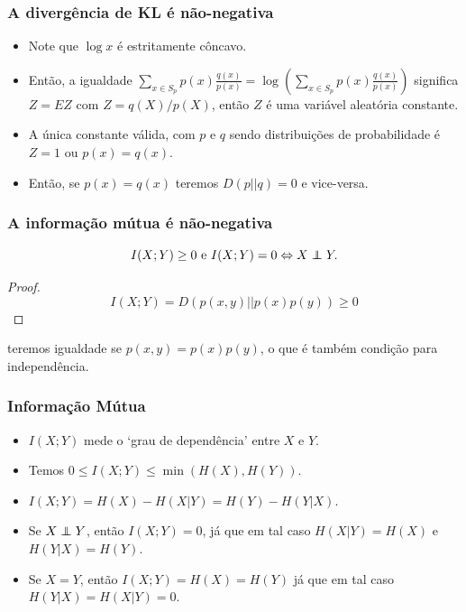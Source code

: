 \begin{frame}%
  \frametitle{A divergência de KL é não-negativa}
  \begin{itemize}
  \item Note que $\log x$ é estritamente côncavo.
  \item Então, a igualdade $\sum_{x \in S_p} p(x) \frac{q(x)}{p(x)} = \log \left( \sum_{x \in S_p} p(x) \frac{q(x)}{p(x)} \right)$ significa $Z=E Z$ com $Z = q(X)/p(X)$, então $Z$ é uma variável aleatória constante.
  \item A única constante válida, com $p$ e $q$ sendo distribuições de probabilidade é
  $Z=1$ ou $p(x)=q(x)$.
  \item Então, se $p(x)=q(x)$ teremos $D(p||q)=0$ e vice-versa.
  \end{itemize}
\end{frame}

\begin{frame}%
  \frametitle{A informação mútua é não-negativa}
  \begin{proposition}
  \begin{equation} 
  I(X;Y) \geq 0 \text{ e } I(X;Y) = 0 \Leftrightarrow X \independent Y.
  \end{equation}
  \end{proposition}

  \begin{proof}
  \begin{equation}
  I(X;Y) = D(p(x,y)||p(x)p(y)) \geq 0
  \end{equation}
  \end{proof}
  teremos igualdade se $p(x,y)=p(x)p(y)$, o que é também condição para independência.
\end{frame}

\begin{frame}%
  \frametitle{Informação Mútua}
  \begin{itemize}
  \item $I(X;Y)$ mede o `grau de dependência' entre $X$ e $Y$.
  \item Temos $0 \leq I(X;Y) \leq \min (H(X),H(Y))$.
  \item $I(X;Y) = H(X) - H(X|Y) = H(Y) - H(Y|X)$.
  \item Se $X \independent Y$, então $I(X;Y)=0$, já que em tal caso $H(X|Y)=H(X)$
  e $H(Y|X)=H(Y)$.
  \item Se $X=Y$, então $I(X;Y) = H(X) = H(Y)$ já que em tal caso $H(Y|X)=H(X|Y)=0$.
  \end{itemize}
\end{frame}


